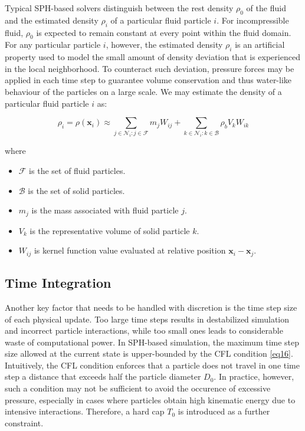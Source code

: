 \documentclass[
	11pt, 
	DIV10,
	ngerman,
	a4paper, 
	oneside, 
	headings=normal, 
	captions=tableheading,
	final, 
	numbers=noenddot
]{scrartcl}
\begin{document}
Typical SPH-based solvers distinguish between the rest density $ \rho_{0} $ of the fluid and the estimated density $ \rho_{i} $ of a particular fluid particle $ i $. For incompressible fluid, $ \rho_{0} $ is expected to remain constant at every point within the fluid domain. For any particular particle $ i $, however, the estimated density $ \rho_{i} $ is an artificial property used to model the small amount of density deviation that is experienced in the local neighborhood. To counteract such deviation, pressure forces may be applied in each time step to guarantee volume conservation and thus water-like behaviour of the particles on a large scale. We may estimate the density of a particular fluid particle $ i $ as:

\begin{equation}
    \label{eq13}
    \rho_{i} = \rho(\mathbf{x}_{i}) \approx \sum_{j \in \mathcal{N}_{i}:j \in \mathcal{F}} m_{j} W_{ij} + \sum_{k \in \mathcal{N}_{i}:k \in \mathcal{B}} \rho_{b} V_{k} W_{ik}
\end{equation}

where

\begin{itemize}
    \item $ \mathcal{F} $ is the set of fluid particles.
    \item $ \mathcal{B} $ is the set of solid particles.
    \item $ m_{j} $ is the mass associated with fluid particle $ j $.
    \item $ V_{k} $ is the representative volume of solid particle $ k $.
    \item $ W_{ij} $ is kernel function value evaluated at relative position $ \mathbf{x}_i - \mathbf{x}_j $.
\end{itemize}

\subsection{Time Integration}

Another key factor that needs to be handled with discretion is the time step size of each physical update. Too large time steps results in destabilized simulation and incorrect particle interactions, while too small ones leads to considerable waste of computational power. In SPH-based simulation, the maximum time step size allowed at the current state is upper-bounded by the CFL condition \eqref{eq16}. Intuitively, the CFL condition enforces that a particle does not travel in one time step a distance that exceeds half the particle diameter $ D_{0} $. In practice, however, such a condition may not be sufficient to avoid the occurence of excessive pressure, especially in cases where particles obtain high kinematic energy due to intensive interactions. Therefore, a hard cap $ T_{0} $ is introduced as a further constraint.
\end{document}
